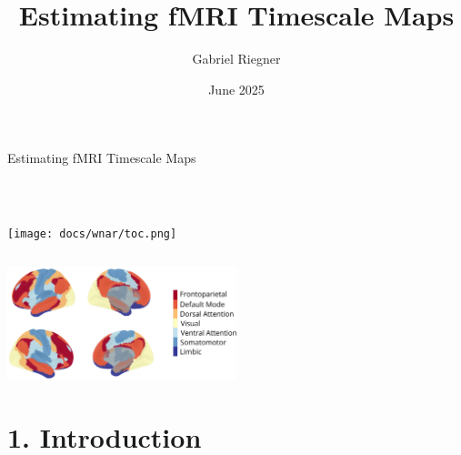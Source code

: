 \documentclass[8pt,aspectratio=169]{beamer}
\title{Estimating fMRI Timescale Maps}
\author[]{Gabriel Riegner}
\date{June 2025}
\begin{document}
\begin{frame}{\centerline{\Large Estimating fMRI Timescale Maps}}
\\
\vfill

\begin{columns}
\tableofcontents[hideallsubsections]
\texttt{[image: docs/wnar/toc.png]}
\end{columns}

\vfill
\includegraphics[width=0.5\textwidth]{docs/wnar/toc.pdf}
\end{frame}

\section{1. Introduction}
\end{document}
